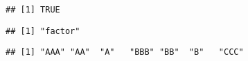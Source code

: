 \documentclass[
]{article}
\newenvironment{Shaded}{\begin{snugshade}}{\end{snugshade}}
\newcommand{\DecValTok}[1]{\textcolor[rgb]{0.00,0.00,0.81}{#1}}
\newcommand{\KeywordTok}[1]{\textcolor[rgb]{0.13,0.29,0.53}{\textbf{#1}}}
\newcommand{\NormalTok}[1]{#1}
\newcommand{\OperatorTok}[1]{\textcolor[rgb]{0.81,0.36,0.00}{\textbf{#1}}}
\begin{document}
\begin{verbatim}
## [1] TRUE
\end{verbatim}

\begin{Shaded}
\end{Shaded}

\begin{verbatim}
## [1] "factor"
\end{verbatim}

\begin{Shaded}
\end{Shaded}

\begin{verbatim}
## [1] "AAA" "AA"  "A"   "BBB" "BB"  "B"   "CCC"
\end{verbatim}
\end{document}
